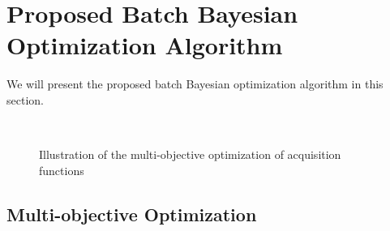 \section{Proposed Batch Bayesian Optimization Algorithm}
We will present the proposed batch Bayesian optimization algorithm in this section.

\begin{figure}[tp!]
    \centering
    ~
    \caption{Illustration of the multi-objective optimization of acquisition functions}
    \label{fig:PF_example}
\end{figure}

\subsection{Multi-objective Optimization}\label{sec:MOForumlation}

